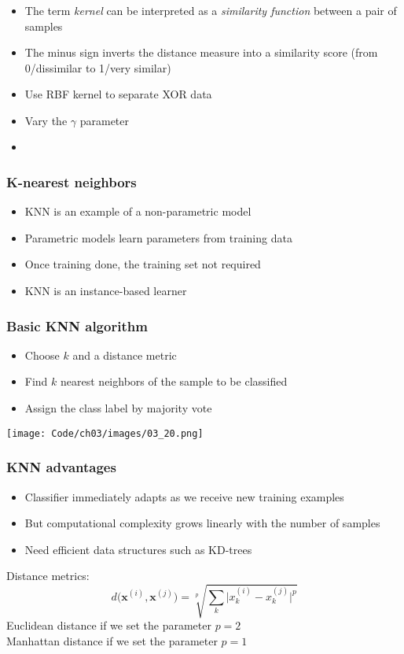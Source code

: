 \documentclass{beamer}
\begin{document}
\begin{frame}
  \frametitle{}
  \begin{itemize}
  \item The term \textit{kernel} can be interpreted as a \textit{similarity function} between a pair of samples
  \item The minus sign inverts the distance measure into a similarity score (from 0/dissimilar to 1/very similar)
  \item Use RBF kernel to separate XOR data
  \item Vary the $\gamma$ parameter
  \item \href{https://github.com/rasbt/python-machine-learning-book/blob/master/code/ch03/ch03.ipynb}{}
  \end{itemize}
\end{frame}

\begin{frame}
  \frametitle{K-nearest neighbors}
  \begin{itemize}
  \item KNN is an example of a non-parametric model
  \item Parametric models learn parameters from training data
  \item Once training done, the training set not required
  \item KNN is an instance-based learner
  \end{itemize}
\end{frame}

\begin{frame}
  \frametitle{Basic KNN algorithm}
  \begin{itemize}
  \item Choose $k$ and a distance metric
  \item Find $k$ nearest neighbors of the sample to be classified
  \item Assign the class label by majority vote
  \end{itemize}
\end{frame}

\begin{frame}
  \texttt{[image: Code/ch03/images/03\_20.png]}
\end{frame}

\begin{frame}
  \frametitle{KNN advantages}
  \begin{itemize}
  \item Classifier immediately adapts as we receive new training examples
  \item But computational complexity grows linearly with the number of samples
  \item Need efficient data structures such as KD-trees
  \end{itemize}
  Distance metrics:
  \[
  d \big(\mathbf{x}^{(i)}, \mathbf{x}^{(j)}\big) =  \sqrt[p]{\sum_k \big| x_{k}^{(i)} - x_{k}^{(j)} \big|^p }
  \]
  Euclidean distance if we set the parameter $p=2$ \\
  Manhattan distance if we set the parameter $p=1$
\end{frame}
\end{document}
